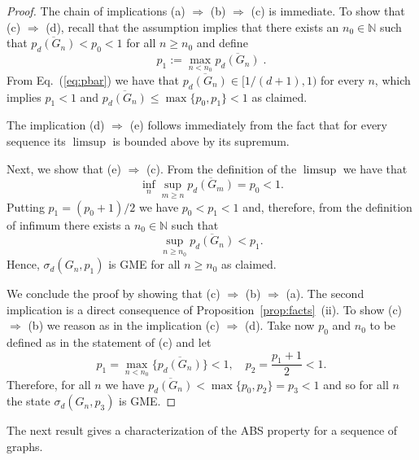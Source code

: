 \documentclass[a4paper,onecolumn,accepted=2024-12-14]{quantumarticle}
\theoremstyle{plain}
\begin{document}
\begin{proof} The chain of implications (a) $\Rightarrow$ (b) $\Rightarrow$ (c) is immediate. To show that (c) $\Rightarrow$ (d), recall that the assumption implies that there exists an $ n_0\in\mathbb{N}$ such that $\overline{p_d(G_n)}<p_0<1$ for all $ n\geq n_0$ and define
\begin{equation}
p_1:=\max_{n<n_0}\overline{p_d(G_n)}\;.
\end{equation}
From Eq.~(\ref{eq:pbar}) we have  that $\overline{p_d(G_n)}\in[1/(d+1),1)$ for every $n$, which implies $p_1<1$ and
$\overline{p_d(G_n)}\leq\max\{p_0,p_1\}<1$ as claimed.

The implication (d) $\Rightarrow$ (e) follows immediately from the fact that for every sequence its $\limsup$ is bounded above by its supremum.

Next, we show that (e) $\Rightarrow$ (c). From the definition of the
$\limsup$ we have that
\begin{equation}
\inf_n\sup_{m\geq n}\overline{p_d(G_{m})}=p_0<1.
\end{equation}
Putting $p_1=(p_0+1)/2$ we have $p_0<p_1<1$
and, therefore, from the definition of infimum there exists a $n_0\in\mathbb{N}$ such that
\begin{equation}
\sup_{n\geq n_0}\overline{p_d(G_n)}<p_1.
\end{equation}
Hence, $\sigma_d(G_n,p_1)$ is GME for all $ n\geq n_0$ as claimed.

We conclude the proof by showing that (c) $\Rightarrow$ (b) $\Rightarrow$ (a).
The second implication is a direct consequence of
Proposition~\ref{prop:facts}~(ii). To show (c) $\Rightarrow$ (b) we reason as in the implication
(c) $\Rightarrow$ (d). Take now $p_0$ and $n_0$ to be defined as in the statement of (c) and let
\begin{equation}
p_1=\max_{n<n_0}\{\overline{p_d(G_n)}\}<1,\quad p_2=\frac{p_1+1}{2}<1.
\end{equation}
Therefore, for all $n$ we have
$\overline{p_d(G_n)}<\max\{p_0,p_2\}=p_3<1$ and so for all $n$
the state $\sigma_d(G_n,p_3)$ is GME.
\end{proof}

The next result gives a characterization of the ABS property for a sequence of graphs.
\end{document}
